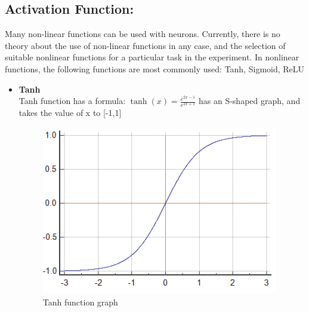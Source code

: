 \subsection{Activation Function:}
Many non-linear functions can be used with neurons. Currently, there is no theory about the use of non-linear functions in any case, and the selection of suitable nonlinear functions for a particular task in the experiment. In nonlinear functions, the following functions are most commonly used: Tanh, Sigmoid, ReLU
\begin{itemize}
	\item \textbf{Tanh}\\
	Tanh function has a formula:  $\tanh(x) = \frac{e^{2x-1}}{e^{2x+1}}$ has an S-shaped graph, and takes the value of x to [-1,1]
	\begin{center}
		\begin{figure}[H]
			\centering
			\includegraphics[width=0.5\columnwidth]{images/chap2/tanh.png}
			\caption{Tanh function graph}
			\label{chap2:tanh}
		\end{figure}
	\end{center}


\end{itemize}
